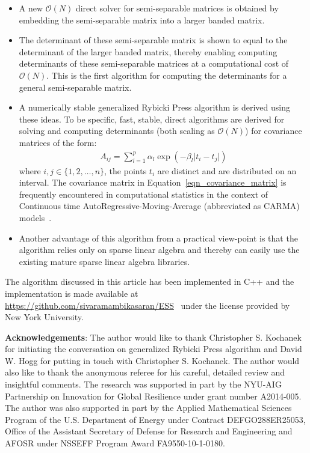 \documentclass[times]{nlaauth}
\begin{document}
\begin{itemize}
\item
A new $\mathcal{O}(N)$ direct solver for semi-separable matrices is obtained by embedding the semi-separable matrix into a larger banded matrix.
\item
The determinant of these semi-separable matrix is shown to equal to the determinant of the larger banded matrix, thereby enabling computing determinants of these semi-separable matrices at a computational cost of $\mathcal{O}(N)$. This is the first algorithm for computing the determinants for a general semi-separable matrix.
\item
A numerically stable generalized Rybicki Press algorithm is derived using these ideas. To be specific, fast, stable, direct algorithms are derived for solving and computing determinants (both scaling as $\mathcal{O}(N)$) for covariance matrices of the form:
\begin{align}
A_{ij} = \sum_{l=1}^p \alpha_l \exp\left(-\beta_l \vert t_i - t_j \vert\right)
\label{eqn_covariance_matrix}
\end{align}
where $i,j \in \{1,2,\ldots,n\}$, the points $t_i$ are distinct and are distributed on an interval. The covariance matrix in Equation~\eqref{eqn_covariance_matrix} is frequently encountered in computational statistics in the context of Continuous time AutoRegressive-Moving-Average (abbreviated as CARMA) models~\cite{brockwell2002introduction, brockwell2001levy, brockwell1994continuous}.
\item
Another advantage of this algorithm from a practical view-point is that the algorithm relies only on sparse linear algebra and thereby can easily use the existing mature sparse linear algebra libraries.
\end{itemize}

The algorithm discussed in this article has been implemented in C++ and the implementation is made available at \url{https://github.com/sivaramambikasaran/ESS}~\cite{ambikasaran2014ESS} under the license provided by New York University.

\textbf{Acknowledgements}: The author would like to thank Christopher S. Kochanek for initiating the conversation on generalized Rybicki Press algorithm and David W. Hogg for putting in touch with Christopher S. Kochanek. The author would also like to thank the anonymous referee for his careful, detailed review and insightful comments. The research was supported in part by the NYU-AIG Partnership on Innovation for Global Resilience under grant number A2014-005. The author was also supported in part by the Applied Mathematical Sciences Program of the U.S. Department of Energy under Contract DEFGO288ER25053, Office of the Assistant Secretary of Defense for Research and Engineering and AFOSR under NSSEFF Program Award FA9550-10-1-0180.
\end{document}
